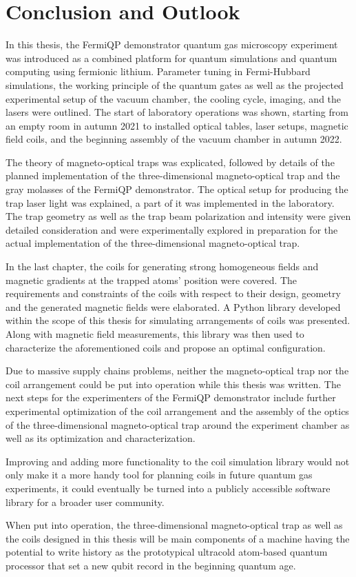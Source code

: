 \renewcommand{\imagepath}{../50-outro/img}

\chapter{Conclusion and Outlook}
In this thesis, the FermiQP demonstrator quantum gas microscopy experiment was introduced as a combined platform for quantum simulations and quantum computing using fermionic lithium. Parameter tuning in Fermi-Hubbard simulations, the working principle of the quantum gates as well as the projected experimental setup of the vacuum chamber, the cooling cycle, imaging, and the lasers were outlined. The start of laboratory operations was shown, starting from an empty room in autumn 2021 to installed optical tables, laser setups, magnetic field coils, and the beginning assembly of the vacuum chamber in autumn 2022.

The theory of magneto-optical traps was explicated, followed by details of the planned implementation of the three-dimensional magneto-optical trap and the gray molasses of the FermiQP demonstrator. The optical setup for producing the trap laser light was explained, a part of it was implemented in the laboratory. The trap geometry as well as the trap beam polarization and intensity were given detailed consideration and were experimentally explored in preparation for the actual implementation of the three-dimensional magneto-optical trap.

In the last chapter, the coils for generating strong homogeneous fields and magnetic gradients at the trapped atoms' position were covered. The requirements and constraints of the coils with respect to their design, geometry and the generated magnetic fields were elaborated. A Python library developed within the scope of this thesis  for simulating arrangements of coils was presented. Along with magnetic field measurements, this library was then used to characterize the aforementioned coils and propose an optimal configuration.

Due to massive supply chains problems, neither the magneto-optical trap nor the coil arrangement could be put into operation while this thesis was written. The next steps for the experimenters of the FermiQP demonstrator include further experimental optimization of the coil arrangement and the assembly of the optics of the three-dimensional magneto-optical trap around the experiment chamber as well as its optimization and  characterization.

Improving and adding more functionality to the coil simulation library would not only make it a more handy tool for planning coils in future quantum gas experiments, it could eventually be turned into a publicly accessible software library for a broader user community.

When put into operation, the three-dimensional magneto-optical trap as well as the coils designed in this thesis will be main components of a machine having the potential to write history as the prototypical ultracold atom-based quantum processor that set a new qubit record in the beginning quantum age.